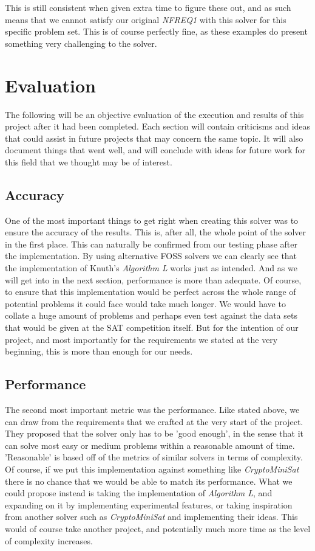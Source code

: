 \documentclass{article}
\begin{document}
This is still consistent when given extra time to figure these out, and as such means that we cannot satisfy our original
\textit{NFREQ1} with this solver for this specific problem set. This is of course perfectly fine, as these examples do present
something very challenging to the solver. 

\section{Evaluation}
The following will be an objective evaluation of the execution and results of this project after it had been completed. Each
section will contain criticisms and ideas that could assist in future projects that may concern the same topic. It will also
document things that went well, and will conclude with ideas for future work for this field that we thought may be of interest.

\subsection{Accuracy}
One of the most important things to get right when creating this solver was to ensure the accuracy of the results. This is, after
all, the whole point of the solver in the first place. This can naturally be confirmed from our testing phase after the
implementation. By using alternative FOSS solvers we can clearly see that the implementation of Knuth's \textit{Algorithm L} works
just as intended. And as we will get into in the next section, performance is more than adequate. Of course, to ensure that this
implementation would be perfect across the whole range of potential problems it could face would take much longer. We would have
to collate a huge amount of problems and perhaps even test against the data sets that would be given at the SAT competition
itself. But for the intention of our project, and most importantly for the requirements we stated at the very beginning, this is
more than enough for our needs.

\subsection{Performance}
The second most important metric was the performance. Like stated above, we can draw from the requirements that we crafted at the
very start of the project. They proposed that the solver only has to be 'good enough', in the sense that it can solve most easy or
medium problems within a reasonable amount of time. 'Reasonable' is based off of the metrics of similar solvers in terms of
complexity. Of course, if we put this implementation against something like \textit{CryptoMiniSat} there is no chance that we
would be able to match its performance. What we could propose instead is taking the implementation of \textit{Algorithm L}, and
expanding on it by implementing experimental features, or taking inspiration from another solver such as \textit{CryptoMiniSat}
and implementing their ideas. This would of course take another project, and potentially much more time as the level of complexity
increases.
\end{document}
